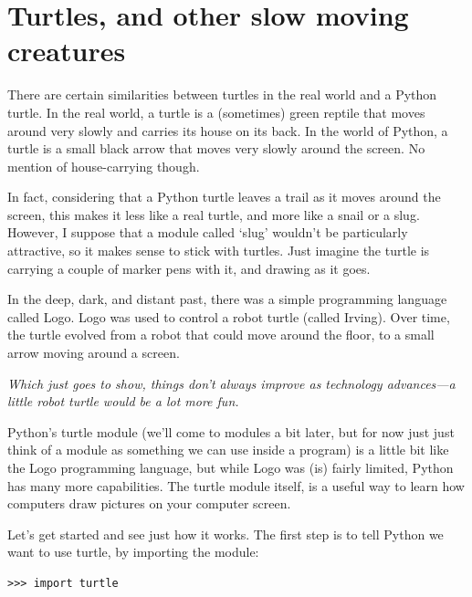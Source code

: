 

\chapter{Turtles, and other slow moving creatures}\label{ch:turtles}

There are certain similarities between turtles in the real world and a Python turtle.  In the real world, a turtle is a (sometimes) green reptile that moves around very slowly and carries its house on its back.  In the world of Python, a turtle is a small black arrow that moves very slowly around the screen. No mention of house-carrying though.

In fact, considering that a Python turtle leaves a trail as it moves around the screen, this makes it less like a real turtle, and more like a snail or a slug.  However, I suppose that a module called `slug' wouldn't be particularly attractive, so it makes sense to stick with turtles.  Just imagine the turtle is carrying a couple of marker pens with it, and drawing as it goes.

In the deep, dark, and distant past, there was a simple programming language called Logo.  Logo was used to control a robot turtle (called Irving).  Over time, the turtle evolved from a robot that could move around the floor, to a small arrow moving around a screen.

\emph{Which just goes to show, things don't always improve as technology advances---a little robot turtle would be a lot more fun.}

Python's turtle module (we'll come to modules a bit later, but for now just just think of a module as something we can use inside a program) is a little bit like the Logo programming language, but while Logo was (is) fairly limited, Python has many more capabilities.  The turtle module itself, is a useful way to learn how computers draw pictures on your computer screen.

Let's get started and see just how it works.  The first step is to tell Python we want to use turtle, by importing the module:

\begin{listing}
\begin{verbatim}
>>> import turtle
\end{verbatim}
\end{listing}

